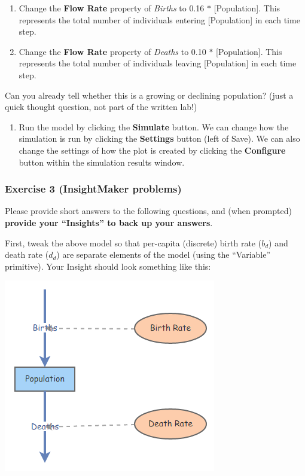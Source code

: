 \documentclass[
]{article}
\providecommand{\tightlist}{%
  \setlength{\itemsep}{0pt}\setlength{\parskip}{0pt}}
\begin{document}
\begin{enumerate}
\def\labelenumi{\arabic{enumi}.}
\setcounter{enumi}{6}
\item
  Change the \textbf{Flow Rate} property of \emph{Births} to 0.16 \(*\)
  {[}Population{]}. This represents the total number of individuals
  entering {[}Population{]} in each time step.
\item
  Change the \textbf{Flow Rate} property of \emph{Deaths} to 0.10 \(*\)
  {[}Population{]}. This represents the total number of individuals
  leaving {[}Population{]} in each time step.
\end{enumerate}

Can you already tell whether this is a growing or declining population?
(just a quick thought question, not part of the written lab!)

\begin{enumerate}
\def\labelenumi{\arabic{enumi}.}
\setcounter{enumi}{8}
\tightlist
\item
  Run the model by clicking the \textbf{Simulate} button. We can change
  how the simulation is run by clicking the \textbf{Settings} button
  (left of Save). We can also change the settings of how the plot is
  created by clicking the \textbf{Configure} button within the
  simulation results window.
\end{enumerate}

\hypertarget{exercise-3-insightmaker-problems}{%
\subsubsection{Exercise 3 (InsightMaker
problems)}\label{exercise-3-insightmaker-problems}}

Please provide short answers to the following questions, and (when
prompted) \textbf{provide your ``Insights'' to back up your answers}.

First, tweak the above model so that per-capita (discrete) birth rate
(\(b_d\)) and death rate (\(d_d\)) are separate elements of the model
(using the ``Variable'' primitive). Your Insight should look something
like this:

\includegraphics{IM3.png}
\end{document}
